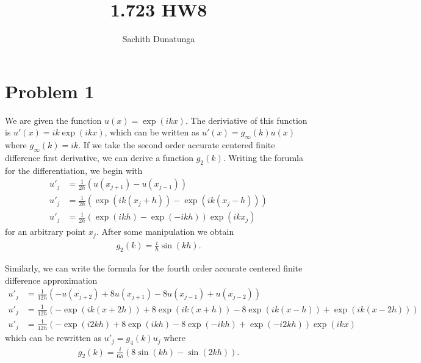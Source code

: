 \documentclass{article}
\title{1.723 HW8}
\author{Sachith  Dunatunga}
\begin{document}
\newcommand{\deriv}[2]{\frac{\partial #1}{ \partial #2}}
\newcommand{\nderiv}[3]{\frac{\partial^{#3} #1}{ \partial #2^{#3}}}
\newcommand{\dx}[1]{\deriv{#1}{x}}
\newcommand{\taylorexpf}[3]{#1_{#2} + \left(#3 \right) \dx{#1}\biggr\rvert_{#2} + \frac{1}{2}\left(#3 \right)^2 \nderiv{#1}{x}{2}\biggr\rvert_{#2} + \frac{1}{6}\left(#3 \right)^3\nderiv{#1}{x}{3}\biggr\rvert_{#2} + \frac{1}{24}\left(#3 \right)^4\nderiv{#1}{x}{4}\biggr\rvert_{#2} + O(h^5)}
\maketitle

\section{Problem 1}
We are given the function $u(x) = \exp(ikx)$.
The deriviative of this function is $u'(x) = ik \exp(ikx)$, which can be written as $u'(x) = g_\infty(k) u(x)$ where $g_\infty(k) = ik$.
If we take the second order accurate centered finite difference first derivative, we can derive a function $g_2(k)$.
Writing the forumla for the differentiation, we begin with
\begin{align}
    u'_j &= \frac{1}{2h} \left( u(x_{j+1}) - u(x_{j-1}) \right) \\
    u'_j &= \frac{1}{2h} \left( \exp(ik(x_j + h)) - \exp(ik(x_j - h))\right) \\
    u'_j &= \frac{1}{2h} \left( \exp(ikh) - \exp(-ikh)\right) \exp(ikx_j)
\end{align}
for an arbitrary point $x_j$.
After some manipulation we obtain
\begin{align}
    g_2(k) = \frac{i}{h}\sin(kh).
\end{align}

Similarly, we can write the formula for the fourth order accurate centered finite difference approximation
\begin{align}
    u'_j &= \frac{1}{12h} \left( -u(x_{j+2}) + 8u(x_{j+1}) - 8u(x_{j-1}) + u(x_{j-2}) \right) \\
    u'_j &= \frac{1}{12h} \left( -\exp(ik(x+2h)) + 8\exp(ik(x+h)) - 8\exp(ik(x-h)) + \exp(ik(x-2h)) \right) \\
    u'_j &= \frac{1}{12h} \left( -\exp(i2kh) + 8\exp(ikh) - 8\exp(-ikh) + \exp(-i2kh) \right) \exp(ikx)
\end{align}
which can be rewritten as $u'_j = g_4(k) u_j$ where
\begin{align}
    g_2(k) = \frac{i}{6h}\left( 8\sin(kh) - \sin(2kh) \right).
\end{align}
\end{document}
